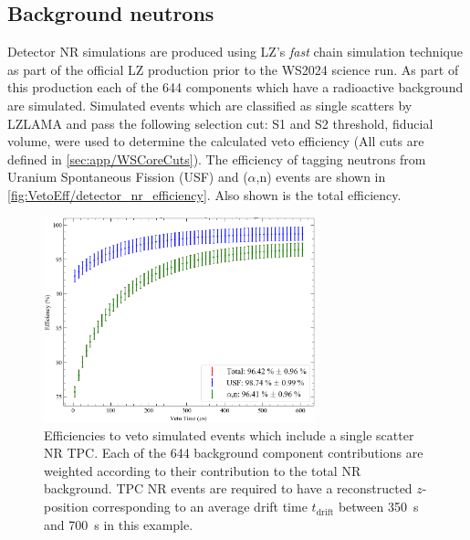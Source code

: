 \subsection{Background neutrons}\label{sec:VetoEff/BackgroundNeutrons}
Detector NR simulations are produced using LZ's \textit{fast} chain simulation technique as part of the official LZ production prior to the WS2024 science run.
As part of this production each of the 644 components which have a radioactive background are simulated.
Simulated events which are classified as single scatters by LZLAMA and pass the following selection cut: S1 and S2 threshold, fiducial volume, were used to determine the calculated veto efficiency (All cuts are defined in \autoref{sec:app/WSCoreCuts}).
The efficiency of tagging neutrons from Uranium Spontaneous Fission (USF) and ($\alpha$,n) events are shown in \autoref{fig:VetoEff/detector_nr_efficiency}. Also shown is the total efficiency.

\begin{figure}[!ht]
	\centering
	\includegraphics[width=0.7\textwidth]{figures/VetoEfficiency/det_nr_efficiency.png}
	\caption[Efficiencies to veto simulated events which include a single scatter NR TPC.]{Efficiencies to veto simulated events which include a single scatter NR TPC. Each of the 644 background component contributions are weighted according to their contribution to the total NR background. TPC NR events are required to have a reconstructed $z$-position corresponding to an average drift time $t_\text{drift}$ between 350~\textmu s and 700~\textmu s in this example.}
	\label{fig:VetoEff/detector_nr_efficiency}
\end{figure}

